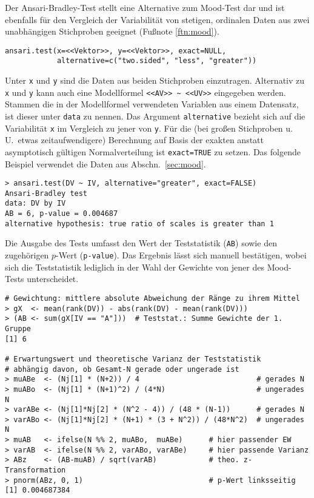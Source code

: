 Der Ansari-Bradley-Test stellt eine Alternative zum Mood-Test dar und ist ebenfalls für den Vergleich der Variabilität von stetigen, ordinalen Daten aus zwei unabhängigen Stichproben geeignet (Fußnote \ref{ftn:mood}).
\begin{lstlisting}
ansari.test(x=<<Vektor>>, y=<<Vektor>>, exact=NULL,
            alternative=c("two.sided", "less", "greater"))
\end{lstlisting}

Unter \lstinline!x! und \lstinline!y! sind die Daten aus beiden Stichproben einzutragen. Alternativ zu \lstinline!x! und \lstinline!y! kann auch eine Modellformel \lstinline!<<AV>> ~ <<UV>>! eingegeben werden. Stammen die in der Modellformel verwendeten Variablen aus einem Datensatz, ist dieser unter \lstinline!data! zu nennen. Das Argument \lstinline!alternative! bezieht sich auf die Variabilität \lstinline!x! im Vergleich zu jener von \lstinline!y!. Für die (bei großen Stichproben u.\,U.\ etwas zeitaufwendigere) Berechnung auf Basis der exakten anstatt asymptotisch gültigen Normalverteilung ist \lstinline!exact=TRUE! zu setzen. Das folgende Beispiel verwendet die Daten aus Abschn.\ \ref{sec:mood}.
\begin{lstlisting}
> ansari.test(DV ~ IV, alternative="greater", exact=FALSE)
Ansari-Bradley test
data: DV by IV
AB = 6, p-value = 0.004687
alternative hypothesis: true ratio of scales is greater than 1
\end{lstlisting}

Die Ausgabe des Tests umfasst den Wert der Teststatistik (\lstinline!AB!) sowie den zugehörigen $p$-Wert (\lstinline!p-value!). Das Ergebnis lässt sich manuell bestätigen, wobei sich die Teststatistik lediglich in der Wahl der Gewichte von jener des Mood-Tests unterscheidet.
\begin{lstlisting}
# Gewichtung: mittlere absolute Abweichung der Ränge zu ihrem Mittel
> gX  <- mean(rank(DV)) - abs(rank(DV) - mean(rank(DV)))
> (AB <- sum(gX[IV == "A"]))  # Teststat.: Summe Gewichte der 1. Gruppe
[1] 6

# Erwartungswert und theoretische Varianz der Teststatistik
# abhängig davon, ob Gesamt-N gerade oder ungerade ist
> muABe  <- (Nj[1] * (N+2)) / 4                           # gerades N
> muABo  <- (Nj[1] * (N+1)^2) / (4*N)                     # ungerades N
> varABe <- (Nj[1]*Nj[2] * (N^2 - 4)) / (48 * (N-1))      # gerades N
> varABo <- (Nj[1]*Nj[2] * (N+1) * (3 + N^2)) / (48*N^2)  # ungerades N
> muAB   <- ifelse(N %% 2, muABo,  muABe)      # hier passender EW
> varAB  <- ifelse(N %% 2, varABo, varABe)     # hier passende Varianz
> ABz    <- (AB-muAB) / sqrt(varAB)            # theo. z-Transformation
> pnorm(ABz, 0, 1)                             # p-Wert linksseitig
[1] 0.004687384
\end{lstlisting}

